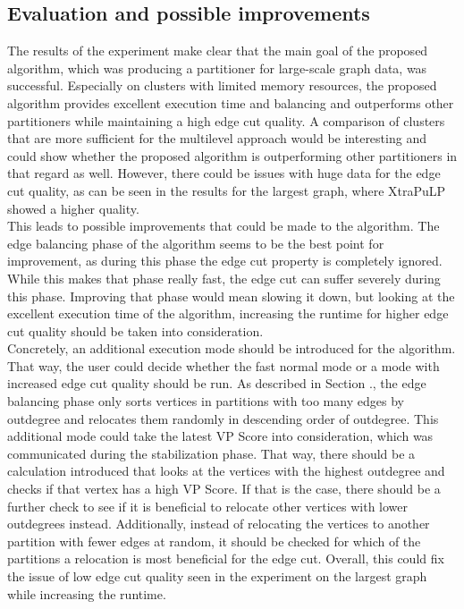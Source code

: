\documentclass[acmsmall,nonacm,screen,review]{acmart}
\begin{document}
\subsection{Evaluation and possible improvements}
The results of the experiment make clear that the main goal of the proposed algorithm, which was producing a partitioner for large-scale graph data, was successful. Especially on clusters with limited memory resources, the proposed algorithm provides excellent execution time and balancing and outperforms other partitioners while maintaining a high edge cut quality. A comparison of clusters that are more sufficient for the multilevel approach would be interesting and could show whether the proposed algorithm is outperforming other partitioners in that regard as well. However, there could be issues with huge data for the edge cut quality, as can be seen in the results for the largest graph, where XtraPuLP showed a higher quality. \\
This leads to possible improvements that could be made to the algorithm. The edge balancing phase of the algorithm seems to be the best point for improvement, as during this phase the edge cut property is completely ignored. While this makes that phase really fast, the edge cut can suffer severely during this phase. Improving that phase would mean slowing it down, but looking at the excellent execution time of the algorithm, increasing the runtime for higher edge cut quality should be taken into consideration. \\
Concretely, an additional execution mode should be introduced for the algorithm. That way, the user could decide whether the fast normal mode or a mode with increased edge cut quality should be run. As described in Section ., the edge balancing phase only sorts vertices in partitions with too many edges by outdegree and relocates them randomly in descending order of outdegree. This additional mode could take the latest VP Score into consideration, which was communicated during the stabilization phase. That way, there should be a calculation introduced that looks at the vertices with the highest outdegree and checks if that vertex has a high VP Score. If that is the case, there should be a further check to see if it is beneficial to relocate other vertices with lower outdegrees instead. Additionally, instead of relocating the vertices to another partition with fewer edges at random, it should be checked for which of the partitions a relocation is most beneficial for the edge cut. Overall, this could fix the issue of low edge cut quality seen in the experiment on the largest graph while increasing the runtime. 
\end{document}
